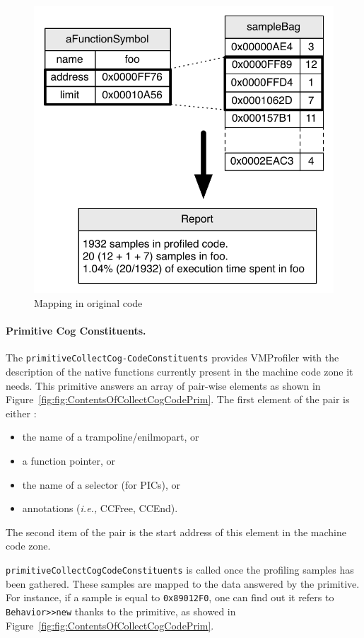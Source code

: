 \documentclass[10pt,preprint,nonatbib]{sigplanconf}
\newcommand{\ct}{\lstinline[backgroundcolor=\color{white},basicstyle=\small\ttfamily]}
\newcommand{\ie}{\emph{i.e.,}\xspace}
\newcommand{\figlabel}[1]{\label{fig:#1}}
\newcommand{\figref}[1]{Figure~\ref{fig:#1}}
\begin{document}
 \begin{figure}[t!]
     \begin{center}
         \includegraphics[width=0.85\linewidth]{OriginalMapping}
         \caption{Mapping in original code}
         \figlabel{fig:OriginalMapping}
     \end{center}
 \end{figure}
 
 \paragraph{Primitive Cog Constituents.}
The \ct{primitiveCollectCog-CodeConstituents} provides VMProfiler with the description of the native functions currently present in the machine code zone it needs. 
This primitive answers an array of pair-wise elements as shown in \figref{fig:ContentsOfCollectCogCodePrim}. The first element of the pair is either :
\begin{itemize}
	\item the name of a trampoline/enilmopart, or
	\item a function pointer, or
	\item the name of a selector (for PICs), or
	\item annotations (\ie CCFree, CCEnd).
\end{itemize}
The second item of the pair is the start address of this element in the machine code zone.

\ct{primitiveCollectCogCodeConstituents} is called once the profiling samples has been gathered. These samples are mapped to the data answered by the primitive. For instance, if a sample is equal to \ct{0x89012F0}, one can find out it refers to \ct{Behavior>>new} thanks to the primitive, as showed in \figref{fig:ContentsOfCollectCogCodePrim}.
\end{document}
